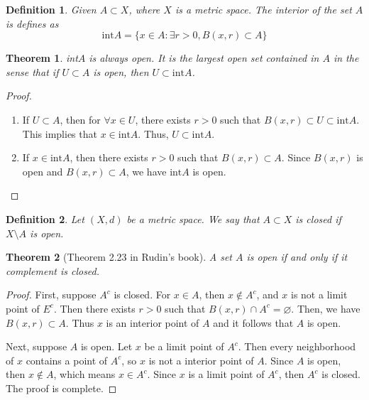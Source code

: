 \documentclass[12pt,leqno]{amsart}
\newtheorem{definition}{Definition}[section]
\newtheorem{theorem}{Theorem}[section]
\theoremstyle{definition}
\numberwithin{equation}{subsection}
\begin{document}
\medskip

\begin{definition}
Given $A\subset X$, where $X$ is a metric space. The interior of the set $A$ is defines as 
$$\text{int}A = \{x\in A: \exists r > 0, B(x,r)\subset A\}$$
\end{definition}

\medskip

\begin{theorem}
int$A$ is always open. It is the largest open set contained in $A$ in the sense that if $U\subset A$ is open, then $U \subset \text{int}A$.
\end{theorem}
\begin{proof}
~\begin{enumerate}
    \item If $U\subset A$, then for $\forall x\in U$, there exists $r>0$ such that $B(x,r)\subset U \subset \text{int}A$. This implies that $x\in \text{int}A$. Thus, $U\subset \text{int}A$.
    \item If $x\in \text{int}A$, then there exists $r>0$ such that $B(x,r)\subset A$. Since $B(x,r)$ is open and $B(x,r)\subset A$, we have $\text{int}A$ is open.
\end{enumerate}
\end{proof}

\medskip

\begin{definition}
Let $(X,d)$ be a metric space. We say that $A\subset X$ is closed if $X\setminus A$ is open.
\end{definition}

\medskip

\begin{theorem}[Theorem 2.23 in Rudin's book]
A set $A$ is open if and only if it complement is closed.
\end{theorem}
\begin{proof}
First, suppose $A^c$ is closed. For $x\in A$, then $x\notin A^c$, and $x$ is not a limit point of $E^c$. Then there exists $r>0$ such that $B(x,r) \cap A^c = \varnothing$. Then, we have $B(x,r) \subset A$. Thus $x$ is an interior point of $A$ and it follows that $A$ is open.

Next, suppose $A$ is open. Let $x$ be a limit point of $A^c$. Then every neighborhood of $x$ contains a point of $A^c$, so $x$ is not a interior point of $A$. Since $A$ is open, then $x\notin A$, which means $x\in A^c$. Since $x$ is a limit point of $A^c$, then $A^c$ is closed. The proof is complete.
\end{proof}
\end{document}
